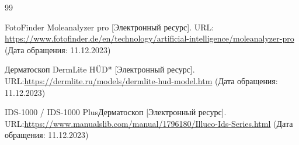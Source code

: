 \newpage
\renewcommand\refname{\centering СПИСОК ИСПОЛЬЗОВАННЫХ ИСТОЧНИКОВ}
\begin {thebibliography} {99}

FotoFinder Moleanalyzer pro [Электронный ресурс]. URL: \href{https://www.fotofinder.de/en/technology/artificial-intelligence/moleanalyzer-pro}{https://www.fotofinder.de/en/technology/artificial-intelligence/moleanalyzer-pro} (Дата обращения: 11.12.2023)

Дерматоскоп DermLite HÜD* [Электронный ресурс]. URL:\href{https://dermlite.ru/models/dermlite-hud-model.htm}{https://dermlite.ru/models/dermlite-hud-model.htm} (Дата обращения: 11.12.2023)

IDS-1000 / IDS-1000 PlusДерматоскоп [Электронный ресурс]. URL:\href{https://www.manualslib.com/manual/1796180/Illuco-Ids-Series.html}{https://www.manualslib.com/manual/1796180/Illuco-Ids-Series.html} (Дата обращения: 11.12.2023)


























\end {thebibliography}



